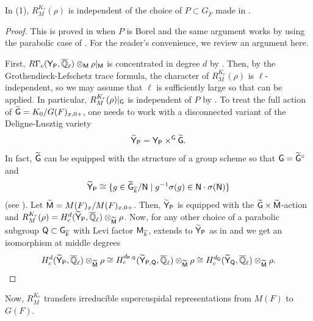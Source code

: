 \documentclass[12pt,reqno]{amsart}
\begin{document}
\begin{prop}
    In  (1), $R^{K_r}_M(\rho)$ is independent of the choice of $P \subset G_{\breve{F}}$ made in . 
\end{prop}
\begin{proof}
    This is proved in \cite[Section 2.6, (2.17)]{Kal21} when $P$ is Borel and the same argument works by using the parabolic case of \cite[Theorem 1.3]{BDR17}. For the reader's convenience, we review an argument here. 
    
    First, $R\Gamma_c({\mathsf{Y}}_{{\mathsf{P}}}, {\overline{\mathbb{Q}}_\ell}) \otimes_{{\mathsf{M}}} \rho\vert_{{\mathsf{M}}}$ is concentrated in degree $d$ by \cite[Corollaire 10.9]{BR03}. Then, by the Grothendieck-Lefschetz trace formula, the character of $R^{K_r}_M(\rho)$ is $\ell$-independent, so we may assume that $\ell$ is sufficiently large so that \cite{BDR17} can be applied. In particular, $R^{K_r}_M(\rho) \vert_{{\mathsf{G}}}$ is independent of $P$ by \cite[Theorem 1.3]{BDR17}. To treat the full action of ${\widetilde{{\mathsf{G}}}} = K_0 / G(F)_{x, 0+}$, one needs to work with a disconnected variant of the Deligne-Lusztig variety
    \[
        {\mathsf{{\widetilde{Y}}}}_{{\mathsf{P}}} = {\mathsf{Y}}_{{\mathsf{P}}} \times^{{\mathsf{G}}}  {\widetilde{{\mathsf{G}}}}. 
    \] 
    In fact, ${\mathsf{{\widetilde{G}}}}$ can be equipped with the structure of a group scheme so that ${\mathsf{G}} = {\mathsf{{\widetilde{G}}}}^\circ$ and
    \[
        {\widetilde{{\mathsf{Y}}}}_{{\mathsf{P}}} \cong \{ g \in {\mathsf{{\widetilde{G}}}}_{{\overline{k}}} / {\mathsf{N}} \mid g ^{-1} \sigma(g) \in {\mathsf{N}} \cdot \sigma({\mathsf{N}}) \}
    \]
    (see \cite[Lemma 2.6.1]{Kal21}). Let ${\mathsf{{\widetilde{M}}}} = M(F)_x / M(F)_{x, 0+}$. Then, ${\widetilde{{\mathsf{Y}}}}_{{\mathsf{P}}}$ is equipped with the ${\mathsf{{\widetilde{G}}}} \times {\mathsf{{\widetilde{M}}}}$-action and $R^{K_r}_M(\rho) = H_c^d({\mathsf{{\widetilde{Y}}}}_{{\mathsf{P}}}, {\overline{\mathbb{Q}}_\ell}) \otimes_{{\mathsf{{\widetilde{M}}}}} \rho$. Now, for any other choice of a parabolic subgroup ${\mathsf{Q}} \subset {\mathsf{G}}_{{\overline{k}}}$ with Levi factor ${\mathsf{M}}_{{\overline{k}}}$, \cite[Theorem 6.2]{BDR17} extends to ${\widetilde{{\mathsf{Y}}}}_{{\mathsf{P}}}$ as in \cite[Lemma 2.6.7]{Kal21} and we get an isomorphism at middle degrees
    \[
         H_c^d({\mathsf{{\widetilde{Y}}}}_{{\mathsf{P}}}, {\overline{\mathbb{Q}}_\ell}) \otimes_{{\mathsf{{\widetilde{M}}}}} \rho \cong H_c^{d_{{\mathsf{P}}, {\mathsf{Q}}}}({\mathsf{{\widetilde{Y}}}}_{{\mathsf{P}}, {\mathsf{Q}}}, {\overline{\mathbb{Q}}_\ell}) \otimes_{{\mathsf{{\widetilde{M}}}}} \rho \cong H_c^{d_{{\mathsf{Q}}}}({\mathsf{{\widetilde{Y}}}}_{{\mathsf{Q}}}, {\overline{\mathbb{Q}}_\ell}) \otimes_{{\mathsf{{\widetilde{M}}}}} \rho. 
    \]
\end{proof}

Now, $R_M^{K_r}$ transfers irreducible supercuspidal representations from $M(F)$ to $G(F)$. 
\end{document}
